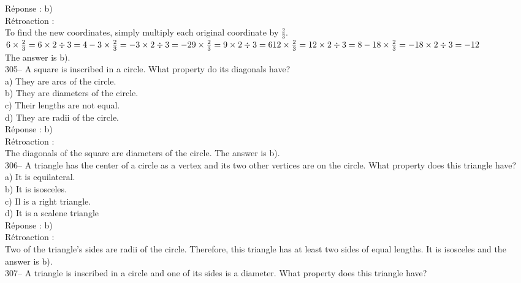 \documentclass[letterpaper, 12pt]{article}
\begin{document}
R\'eponse : b)\\

R\'etroaction :\\
To find the new coordinates, simply multiply each original coordinate by $\frac{2}{3}$.\\[2mm]
$6\times\frac{2}{3}=6\times2\div3=4\\[2mm]
-3\times\frac{2}{3}=-3\times2\div3=-2\\[2mm]
9\times\frac{2}{3}=9\times2\div3=6\\[2mm]
12\times\frac{2}{3}=12\times2\div3=8\\[2mm]
-18\times\frac{2}{3}=-18\times2\div3=-12$\\[2mm]
The answer is b).\\

305-- A square is inscribed in a circle. What property do its diagonals have?\\

a) They are arcs of the circle.\\
b) They are diameters of the circle.\\
c) Their lengths are not equal.\\
d) They are radii of the circle.\\

R\'eponse : b)\\

R\'etroaction :\\
The diagonals of the square are diameters of the circle. The answer is b).\\

306-- A triangle has the center of a circle as a vertex and its two other vertices are on the circle. What property does this triangle have?\\

a) It is equilateral.\\
b) It is isosceles.\\
c) Il is a right triangle.\\
d) It is a scalene triangle\\

R\'eponse : b)\\

R\'etroaction :\\
Two of the triangle's sides are radii of the circle. Therefore, this triangle has at least two sides of equal lengths. It is isosceles and the answer is b).\\

307-- A triangle is inscribed in a circle and one of its sides is a diameter. What property does this triangle have?\\
\end{document}
